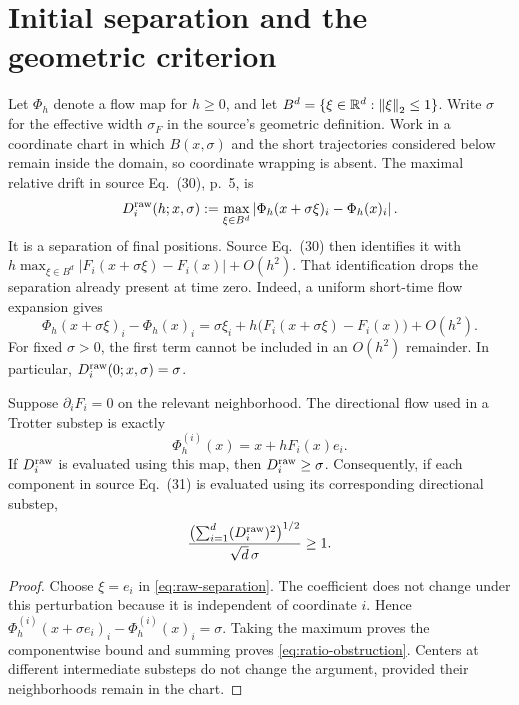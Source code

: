 \section{Initial separation and the geometric criterion}
\label{sec:geometry}

Let $\Phi_h$ denote a flow map for $h\geq0$, and let
$B^d=\{\xi\in\mathbb R^d:\left\lVert \xi\right\rVert_2\leq1\}$. Write $\sigma$ for the
effective width $\sigma_F$ in the source's geometric definition.
Work in a coordinate chart in which $B(x,\sigma)$ and the short trajectories
considered below remain inside the domain, so coordinate wrapping is absent.
The maximal relative drift in source Eq.~(30), p.~5, is
\begin{equation}
 D_i^{\rm raw}(h;x,\sigma)
 :=\max_{\xi\in B^d}
 \left|\Phi_h(x+\sigma\xi)_i-\Phi_h(x)_i\right|.
 \label{eq:raw-separation}
\end{equation}
It is a separation of final positions. Source Eq.~(30) then identifies it with
$h\max_{\xi\in B^d}|F_i(x+\sigma\xi)-F_i(x)|+O(h^2)$.
That identification drops the separation already present at time zero.
Indeed, a uniform short-time flow expansion gives
\begin{equation}
 \Phi_h(x+\sigma\xi)_i-\Phi_h(x)_i
 =\sigma\xi_i+h\bigl(F_i(x+\sigma\xi)-F_i(x)\bigr)+O(h^2).
 \label{eq:flow-offset}
\end{equation}
For fixed $\sigma>0$, the first term cannot be included in an $O(h^2)$
remainder. In particular, $D_i^{\rm raw}(0;x,\sigma)=\sigma$.

\begin{proposition}
\label{prop:raw-obstruction}
Suppose $\partial_iF_i=0$ on the relevant neighborhood. The directional
flow used in a Trotter substep is exactly
\begin{equation}
 \Phi_h^{(i)}(x)=x+hF_i(x)e_i.
 \label{eq:directional-map}
\end{equation}
If $D_i^{\rm raw}$ is evaluated using this map, then
$D_i^{\rm raw}\geq\sigma$. Consequently, if each component in source
Eq.~(31) is evaluated using its corresponding directional substep,
\begin{equation}
 \frac{\bigl(\sum_{i=1}^d(D_i^{\rm raw})^2\bigr)^{1/2}}
 {\sqrt d\,\sigma}\geq1.
 \label{eq:ratio-obstruction}
\end{equation}
\end{proposition}

\begin{proof}
Choose $\xi=e_i$ in \eqref{eq:raw-separation}. The coefficient does not
change under this perturbation because it is independent of coordinate
$i$. Hence
$\Phi_h^{(i)}(x+\sigma e_i)_i-\Phi_h^{(i)}(x)_i=\sigma$.
Taking the maximum proves the componentwise bound and summing proves
\eqref{eq:ratio-obstruction}. Centers at different intermediate substeps
do not change the argument, provided their neighborhoods remain in the chart.
\end{proof}


